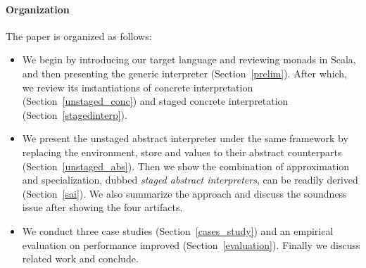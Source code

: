 \paragraph{Organization} The paper is organized as follows:
\begin{itemize}[leftmargin=2em]
  \item We begin by introducing our target language and reviewing
    monads in Scala, and then presenting the generic interpreter
    (Section~\ref{prelim}).  After which, we review its instantiations
    of concrete interpretation (Section~\ref{unstaged_conc}) and
    staged concrete interpretation (Section~\ref{stagedinterp}).
  \item We present the unstaged abstract interpreter under the same
    framework by replacing the environment, store and values to their
    abstract counterparts (Section~\ref{unstaged_abs}). Then we
    show the combination of approximation and specialization, dubbed
    \textit{staged abstract interpreters}, can be readily derived
    (Section~\ref{sai}). We also summarize the approach and discuss
    the soundness issue after showing the four artifacts.
  \item We conduct three case studies (Section~\ref{cases_study}) and
    an empirical evaluation on performance improved (Section~\ref{evaluation}).
    Finally we discuss related work and conclude.
\end{itemize}

\iffalse
On the other side, static analysis is a tradeoff between performance and
precision: higher precision usually leads to longer running time.

4. Existing method to improve the performance is adhoc, engineering heavy, require to rewrite the optimized version, therefore harder to reason about the correctness
6. program analyzers are also meta-programs, they manipulate other programs as data objects
\fi
